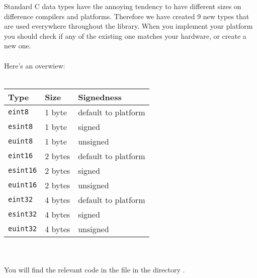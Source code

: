 Standard C data types have the annoying tendency to have different sizes on difference compilers
and platforms. Therefore we have created 9 new types that are used everywhere throughout the library.
When you implement your platform you should check if any of the existing one matches your hardware,
or create a new one.\\
\\
Here's an overwiew:\\\\
\begin{tabular}{|p{4cm}|l|l|}
	\hline
	\textbf{Type} & \textbf{Size} & \textbf{Signedness}\\
	\hline
	\hline
	\texttt{eint8} & 1 byte & default to platform \\
	\texttt{esint8} & 1 byte & signed \\
	\texttt{euint8} & 1 byte & unsigned \\
	\hline
	\texttt{eint16} & 2 bytes & default to platform \\
	\texttt{esint16} & 2 bytes & signed \\
	\texttt{euint16} & 2 bytes & unsigned \\
	\hline
	\texttt{eint32} & 4 bytes & default to platform \\
	\texttt{esint32} & 4 bytes & signed \\
	\texttt{euint32} & 4 bytes & unsigned \\
	\hline
\end{tabular}
$ $\\\\\\
You will find the relevant code in the file  in the directory .
